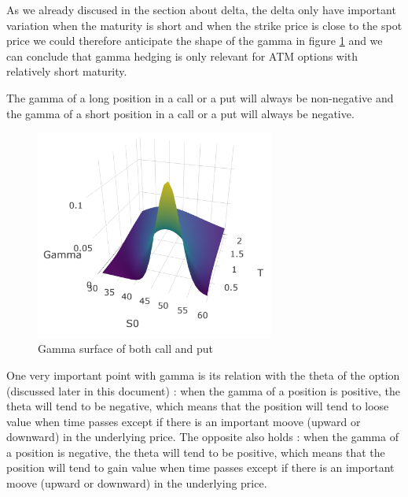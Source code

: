 \documentclass[hidelinks]{article}
\begin{document}
	As we already discused in the section about delta, the delta only have important variation when the maturity is short and when the strike price is close to the spot price we could therefore anticipate the shape of the gamma in figure \ref{fig:gamma} and we can conclude that gamma hedging is only relevant for ATM options with relatively short maturity. 
	
	The gamma of a long position in a call or a put will always be non-negative and the gamma of a short position in a call or a put will always be negative.
	
	\begin{figure}[!h]
	\centering
	\includegraphics[width=0.7\textwidth]{gamma_call.png}
    \caption{Gamma surface of both call and put}
    \label{fig:gamma}
    \end{figure}
    
    One very important point with gamma is its relation with the theta of the option (discussed later in this document) : when the gamma of a position is positive, the theta will tend to be negative, which means that the position will tend to loose value when time passes except if there is an important moove (upward or downward) in the underlying price. The opposite also holds : when the gamma of a position is negative, the theta will tend to be positive, which means that the position will tend to gain value when time passes except if there is an important moove (upward or downward) in the underlying price.
    
\end{document}
